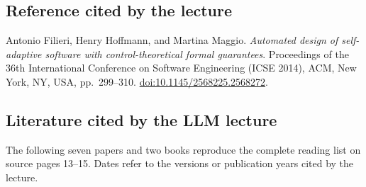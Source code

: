 \documentclass[11pt,a4paper]{article}
\numberwithin{equation}{section}
\numberwithin{figure}{section}
\numberwithin{table}{section}
\begin{document}
\subsection{Reference cited by the lecture}
Antonio Filieri, Henry Hoffmann, and Martina Maggio. \emph{Automated design of self-adaptive software with control-theoretical formal guarantees}. Proceedings of the 36th International Conference on Software Engineering (ICSE 2014), ACM, New York, NY, USA, pp.\ 299--310. \href{https://doi.org/10.1145/2568225.2568272}{doi:10.1145/2568225.2568272}.

\subsection{Literature cited by the LLM lecture}\label{app:llmrefs}
The following seven papers and two books reproduce the complete reading list on source pages 13--15. Dates refer to the versions or publication years cited by the lecture.
\end{document}
